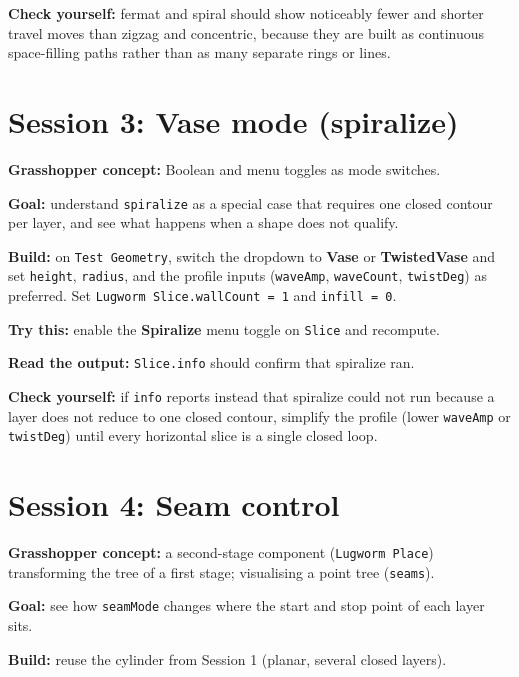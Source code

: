 \documentclass[11pt]{article}
\newcommand{\param}[1]{\texttt{#1}}
\newcommand{\exlabel}[1]{\par\vspace{0.3em}\noindent\textbf{#1:}\enspace}
\begin{document}
\exlabel{Check yourself} fermat and spiral should show noticeably fewer
and shorter travel moves than zigzag and concentric, because they are
built as continuous space-filling paths rather than as many separate
rings or lines.

\section{Session 3: Vase mode (spiralize)}

\exlabel{Grasshopper concept} Boolean and menu toggles as mode
switches.

\exlabel{Goal} understand \param{spiralize} as a special case that
requires one closed contour per layer, and see what happens when a
shape does not qualify.

\exlabel{Build} on \param{Test Geometry}, switch the dropdown to
\textbf{Vase} or \textbf{TwistedVase} and set \param{height},
\param{radius}, and the profile inputs (\param{waveAmp},
\param{waveCount}, \param{twistDeg}) as preferred. Set \param{Lugworm
Slice.wallCount = 1} and \param{infill = 0}.

\exlabel{Try this} enable the \textbf{Spiralize} menu toggle on
\param{Slice} and recompute.

\exlabel{Read the output} \param{Slice.info} should confirm that
spiralize ran.

\exlabel{Check yourself} if \param{info} reports instead that spiralize
could not run because a layer does not reduce to one closed contour,
simplify the profile (lower \param{waveAmp} or \param{twistDeg}) until
every horizontal slice is a single closed loop.

\section{Session 4: Seam control}

\exlabel{Grasshopper concept} a second-stage component (\param{Lugworm
Place}) transforming the tree of a first stage; visualising a point
tree (\param{seams}).

\exlabel{Goal} see how \param{seamMode} changes where the start and
stop point of each layer sits.

\exlabel{Build} reuse the cylinder from Session 1 (planar, several
closed layers).
\end{document}
